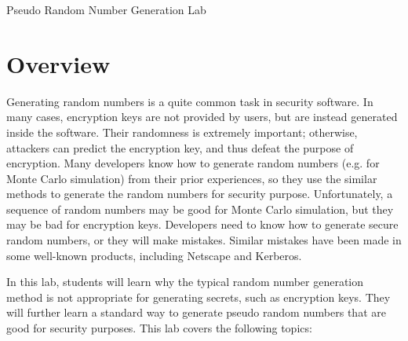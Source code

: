





\newcommand{\randFigs}{./Figs/../Random_Number/Figures}




\begin{center}
{\LARGE Pseudo Random Number Generation Lab}
\end{center}




\section{Overview}

Generating random numbers is a quite common task in security software. 
In many cases, encryption keys are not provided by users, but are instead 
generated inside the software. Their randomness is extremely important;
otherwise, attackers can predict the encryption key, and thus defeat the 
purpose of encryption. Many developers know how to generate random
numbers (e.g. for Monte Carlo simulation)
from their prior experiences, so they use the similar methods
to generate the random numbers for security purpose. Unfortunately,
a sequence of random numbers may be good for Monte Carlo simulation, but
they may be bad for encryption keys. Developers need to know how to
generate secure random numbers, or they will make mistakes. Similar
mistakes have been made in some well-known products, including
Netscape and Kerberos. 

In this lab, students will learn why the typical 
random number generation method is not appropriate for generating 
secrets, such as encryption keys. They will further learn 
a standard way to generate pseudo random numbers that are good for security purposes.
This lab covers the following topics:

